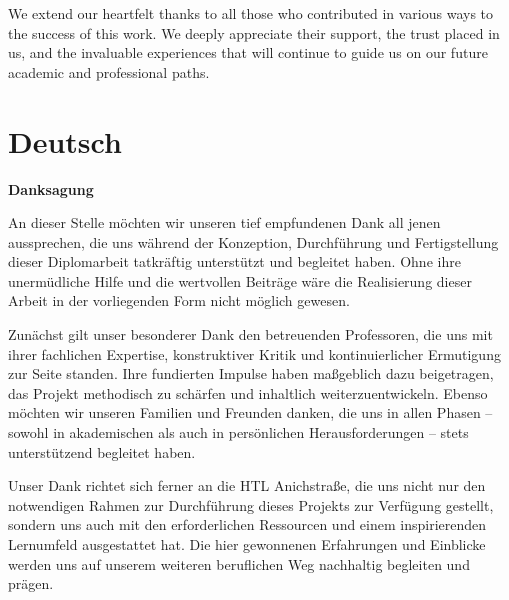 We extend our heartfelt thanks to all those who contributed in various ways to the success of this work. We deeply appreciate their support, the trust placed in us, and the invaluable experiences that will continue to guide us on our future academic and professional paths.


\section*{Deutsch}
\textbf{Danksagung}

An dieser Stelle möchten wir unseren tief empfundenen Dank all jenen aussprechen, die uns während der Konzeption, Durchführung und Fertigstellung dieser Diplomarbeit tatkräftig unterstützt und begleitet haben. Ohne ihre unermüdliche Hilfe und die wertvollen Beiträge wäre die Realisierung dieser Arbeit in der vorliegenden Form nicht möglich gewesen.

Zunächst gilt unser besonderer Dank den betreuenden Professoren, die uns mit ihrer fachlichen Expertise, konstruktiver Kritik und kontinuierlicher Ermutigung zur Seite standen. Ihre fundierten Impulse haben maßgeblich dazu beigetragen, das Projekt methodisch zu schärfen und inhaltlich weiterzuentwickeln. Ebenso möchten wir unseren Familien und Freunden danken, die uns in allen Phasen – sowohl in akademischen als auch in persönlichen Herausforderungen – stets unterstützend begleitet haben.

Unser Dank richtet sich ferner an die HTL Anichstraße, die uns nicht nur den notwendigen Rahmen zur Durchführung dieses Projekts zur Verfügung gestellt, sondern uns auch mit den erforderlichen Ressourcen und einem inspirierenden Lernumfeld ausgestattet hat. Die hier gewonnenen Erfahrungen und Einblicke werden uns auf unserem weiteren beruflichen Weg nachhaltig begleiten und prägen.

